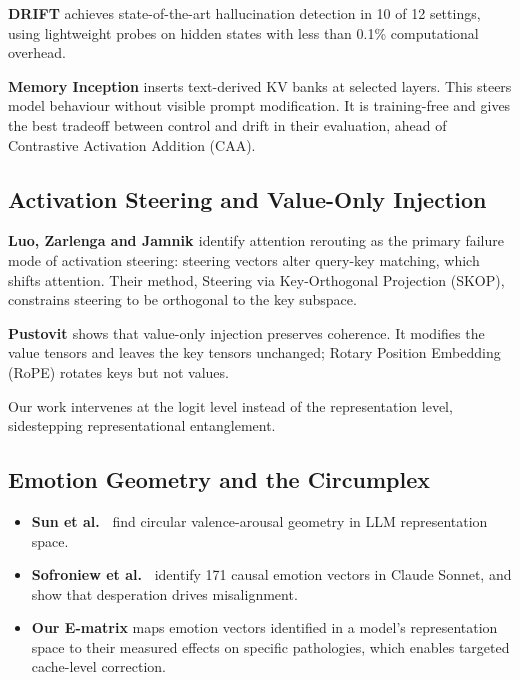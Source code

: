 \documentclass[11pt,letterpaper]{article}
\providecommand{\tightlist}{\setlength{\itemsep}{0pt}\setlength{\parskip}{0pt}}
\DeclareRobustCommand{\_}{\textunderscore\allowbreak}
\begin{document}
\textbf{DRIFT} \cite{bhatnagar2026drift} achieves state-of-the-art hallucination detection in 10 of 12 settings, using lightweight probes on hidden states with less than 0.1\% computational overhead.

\textbf{Memory Inception} \cite{liu2026memory} inserts text-derived KV banks at selected layers. This steers model behaviour without visible prompt modification. It is training-free and gives the best tradeoff between control and drift in their evaluation, ahead of Contrastive Activation Addition (CAA).

\hypertarget{activation-steering-and-value-only-injection}{%
\subsection{Activation Steering and Value-Only Injection}\label{activation-steering-and-value-only-injection}}

\textbf{Luo, Zarlenga and Jamnik \cite{luo2026dont}} identify attention rerouting as the primary failure mode of activation steering: steering vectors alter query-key matching, which shifts attention. Their method, Steering via Key-Orthogonal Projection (SKOP), constrains steering to be orthogonal to the key subspace.

\textbf{Pustovit \cite{pustovit2026knowledge}} shows that value-only injection preserves coherence. It modifies the value tensors and leaves the key tensors unchanged; Rotary Position Embedding (RoPE) rotates keys but not values.

Our work intervenes at the logit level instead of the representation level, sidestepping representational entanglement.

\hypertarget{emotion-geometry-and-the-circumplex}{%
\subsection{Emotion Geometry and the Circumplex}\label{emotion-geometry-and-the-circumplex}}

\begin{itemize}
\tightlist
\item
  \textbf{Sun et al.~\cite{sun2026valence}} find circular valence-arousal geometry in LLM representation space.
\item
  \textbf{Sofroniew et al.~\cite{sofroniew2026emotion}} identify 171 causal emotion vectors in Claude Sonnet, and show that desperation drives misalignment.
\item
  \textbf{Our E-matrix} maps emotion vectors identified in a model's representation space to their measured effects on specific pathologies, which enables targeted cache-level correction.
\end{itemize}
\end{document}
